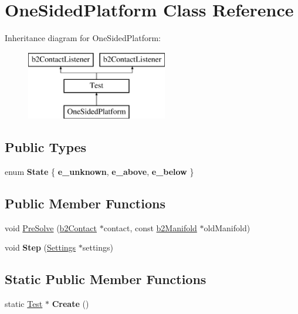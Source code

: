 \hypertarget{class_one_sided_platform}{\section{One\-Sided\-Platform Class Reference}
\label{class_one_sided_platform}
}
Inheritance diagram for One\-Sided\-Platform\-:\begin{figure}[H]
\begin{center}
\leavevmode
\includegraphics[height=3.000000cm]{class_one_sided_platform}
\end{center}
\end{figure}
\subsection*{Public Types}
\begin{DoxyCompactItemize}
\item 
enum {\bfseries State} \{ {\bfseries e\-\_\-unknown}, 
{\bfseries e\-\_\-above}, 
{\bfseries e\-\_\-below}
 \}
\end{DoxyCompactItemize}
\subsection*{Public Member Functions}
\begin{DoxyCompactItemize}
\item 
void \hyperlink{class_one_sided_platform_a9a2f282d5907773999658850a54b15f9}{Pre\-Solve} (\hyperlink{classb2_contact}{b2\-Contact} $\ast$contact, const \hyperlink{structb2_manifold}{b2\-Manifold} $\ast$old\-Manifold)
\item 
\hypertarget{class_one_sided_platform_ace5612f3a074a699fcdf1c7106a52989}{void {\bfseries Step} (\hyperlink{struct_settings}{Settings} $\ast$settings)}\label{class_one_sided_platform_ace5612f3a074a699fcdf1c7106a52989}

\end{DoxyCompactItemize}
\subsection*{Static Public Member Functions}
\begin{DoxyCompactItemize}
\item 
\hypertarget{class_one_sided_platform_aa9e16ab16984815ba7e6bd30ecc988bc}{static \hyperlink{class_test}{Test} $\ast$ {\bfseries Create} ()}\label{class_one_sided_platform_aa9e16ab16984815ba7e6bd30ecc988bc}

\end{DoxyCompactItemize}
